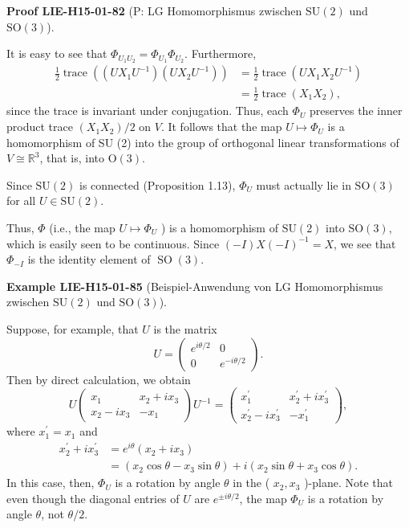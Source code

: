 \documentclass[10pt, letterpaper]{article}
\newcommand{\SO}{\mathrm{SO}}
\newcommand{\SU}{\mathrm{SU}}
\newcommand{\CustomHeading}[3]{%
  \par\medskip\noindent%
  \textbf{#1 #2} \textnormal{(#3)}.\enskip%
}
\newenvironment{EXA}[2]{\begin{unitbox}\CustomHeading{Example}{#1}{#2}}{\end{unitbox}}
\newenvironment{PROOF}[2]{\begin{unitbox}\CustomHeading{Proof}{#1}{#2}}{\end{unitbox}}
\begin{document}
\begin{PROOF}{LIE-H15-01-82}{P: LG Homomorphismus zwischen $\SU(2)$ und $\SO(3)$}
It is easy to see that $\Phi_{U_{1} U_{2}}=\Phi_{U_{1}} \Phi_{U_{2}}$. Furthermore,
$$
\begin{aligned}
\frac{1}{2} \operatorname{trace}\left(\left(U X_{1} U^{-1}\right)\left(U X_{2} U^{-1}\right)\right) & =\frac{1}{2} \operatorname{trace}\left(U X_{1} X_{2} U^{-1}\right) \\
& =\frac{1}{2} \operatorname{trace}\left(X_{1} X_{2}\right),
\end{aligned}
$$
since the trace is invariant under conjugation. Thus, each $\Phi_{U}$ preserves the inner product trace $\left(X_{1} X_{2}\right) / 2$ on $V$. It follows that the map $U \mapsto \Phi_{U}$ is a homomorphism of SU (2) into the group of orthogonal linear transformations of $V \cong \mathbb{R}^{3}$, that is, into $\mathrm{O}(3)$. 

Since $\mathrm{SU}(2)$ is connected (Proposition 1.13), $\Phi_{U}$ must actually lie in $\mathrm{SO}(3)$ for all $U \in \mathrm{SU}(2)$. 

Thus, $\Phi$ (i.e., the map $U \mapsto \Phi_{U}$ ) is a homomorphism of $\mathrm{SU}(2)$ into $\mathrm{SO}(3)$, which is easily seen to be continuous. Since $(-I) X(-I)^{-1}=X$, we see that $\Phi_{-I}$ is the identity element of $\operatorname{SO}(3)$.
\end{PROOF}



\begin{EXA}{LIE-H15-01-85}{Beispiel-Anwendung von LG Homomorphismus zwischen $\SU(2)$ und $\SO(3)$}
Suppose, for example, that $U$ is the matrix
$$
U=\left(\begin{array}{cc}
e^{i \theta / 2} & 0 \\
0 & e^{-i \theta / 2}
\end{array}\right) .
$$
Then by direct calculation, we obtain
$$
U\left(\begin{array}{cc}
x_{1} & x_{2}+i x_{3} \\
x_{2}-i x_{3} & -x_{1}
\end{array}\right) U^{-1}=\left(\begin{array}{cc}
x_{1}^{\prime} & x_{2}^{\prime}+i x_{3}^{\prime} \\
x_{2}^{\prime}-i x_{3}^{\prime} & -x_{1}^{\prime}
\end{array}\right),
$$
where $x_{1}^{\prime}=x_{1}$ and
$$
\begin{aligned}
x_{2}^{\prime}+i x_{3}^{\prime} & =e^{i \theta}\left(x_{2}+i x_{3}\right) \\
& =\left(x_{2} \cos \theta-x_{3} \sin \theta\right)+i\left(x_{2} \sin \theta+x_{3} \cos \theta\right) .
\end{aligned}
$$
In this case, then, $\Phi_{U}$ is a rotation by angle $\theta$ in the ( $x_{2}, x_{3}$ )-plane. Note that even though the diagonal entries of $U$ are $e^{ \pm i \theta / 2}$, the map $\Phi_{U}$ is a rotation by angle $\theta$, not $\theta / 2$.
\end{EXA}
\end{document}
